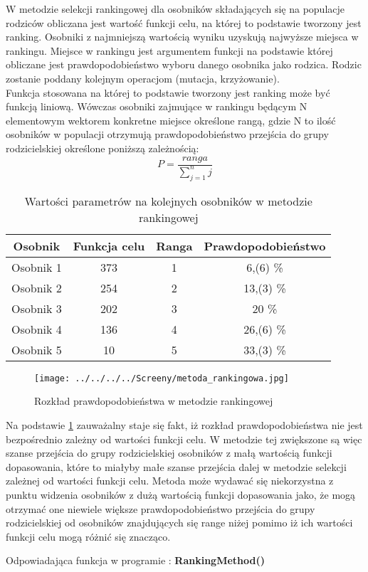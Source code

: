 W metodzie selekcji rankingowej dla osobników składających się na populacje rodziców obliczana jest wartość funkcji celu, na której to podstawie tworzony jest ranking. Osobniki z najmniejszą wartością wyniku uzyskują najwyższe miejsca w rankingu. Miejsce w rankingu jest argumentem funkcji na podstawie której obliczane jest prawdopodobieństwo wyboru danego osobnika jako rodzica. Rodzic zostanie poddany kolejnym operacjom (mutacja, krzyżowanie).\\
 Funkcja stosowana na której to podstawie tworzony jest ranking może być funkcją liniową. Wówczas osobniki zajmujące w rankingu będącym N elementowym wektorem konkretne miejsce określone rangą, gdzie N to ilość osobników w populacji otrzymują prawdopodobieństwo przejścia do grupy rodzicielskiej określone poniższą zależnością:
$$
P = \frac{ranga}{\sum_{j=1}^{n}j}
$$

\begin{table}[h!]
\begin{center}
\begin{tabular}{|c|c|c|c|}
\hline
\textbf{Osobnik}  & \textbf{Funkcja celu} & \textbf{Ranga} & \textbf{Prawdopodobieństwo}\\
\hline
Osobnik 1 & 373 & 1 & 6,(6) \% \\
\hline
Osobnik 2 &254 & 2  & 13,(3)  \% \\
\hline
Osobnik 3 & 202 & 3 & 20  \% \\
\hline
Osobnik 4 & 136 & 4 & 26,(6)  \% \\
\hline
Osobnik 5 & 10 & 5 & 33,(3)  \% \\
\hline
\end{tabular}
\caption{Wartości parametrów na kolejnych osobników w metodzie rankingowej}
\end{center}
\end{table}

\vspace{0,4cm}

\begin{figure}[h]
		\texttt{[image: ../../../../Screeny/metoda\_rankingowa.jpg]}
		\caption{Rozkład prawdopodobieństwa w metodzie rankingowej}
		\label{ranking}			
\end{figure}
\par
Na podstawie \ref{ranking} zauważalny staje się fakt, iż rozkład prawdopodobieństwa nie jest bezpośrednio zależny od wartości funkcji celu. W metodzie tej zwiększone są więc szanse przejścia do grupy rodzicielskiej osobników z małą wartością funkcji dopasowania, które to miałyby małe szanse przejścia dalej w metodzie selekcji zależnej od wartości funkcji celu. Metoda może wydawać się niekorzystna z punktu widzenia osobników z dużą wartością funkcji dopasowania jako, że mogą otrzymać one niewiele większe prawdopodobieństwo przejścia do grupy rodzicielskiej od osobników znajdujących się range niżej pomimo iż ich wartości funkcji celu mogą różnić się znacząco.
\par
\vspace{0,4cm}
Odpowiadająca funkcja w programie : \textbf{RankingMethod()}


